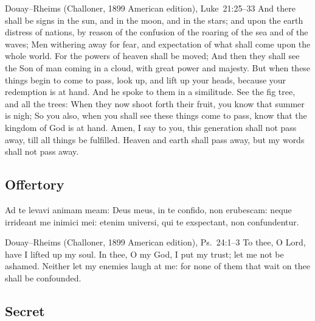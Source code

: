 \begin{englishwitness}{Douay--Rheims (Challoner, 1899 American edition), Luke~21:25--33}
And there shall be signs in the sun, and in the moon, and in the stars; and upon the earth distress of nations, by reason of the confusion of the roaring of the sea and of the waves; Men withering away for fear, and expectation of what shall come upon the whole world. For the powers of heaven shall be moved; And then they shall see the Son of man coming in a cloud, with great power and majesty. But when these things begin to come to pass, look up, and lift up your heads, because your redemption is at hand. And he spoke to them in a similitude. See the fig tree, and all the trees: When they now shoot forth their fruit, you know that summer is nigh; So you also, when you shall see these things come to pass, know that the kingdom of God is at hand. Amen, I say to you, this generation shall not pass away, till all things be fulfilled. Heaven and earth shall pass away, but my words shall not pass away.
\end{englishwitness}

\subsection{Offertory}\label{proper-offertory}

\begin{latinproper}
Ad te levavi animam meam: Deus meus, in te confido, non erubescam: neque irrideant me inimici mei: etenim universi, qui te exspectant, non confundentur.
\end{latinproper}

\begin{englishwitness}{Douay--Rheims (Challoner, 1899 American edition), Ps.~24:1--3}
To thee, O Lord, have I lifted up my soul. In thee, O my God, I put my trust; let me not be ashamed. Neither let my enemies laugh at me: for none of them that wait on thee shall be confounded.
\end{englishwitness}

\subsection{Secret}\label{proper-secret}

